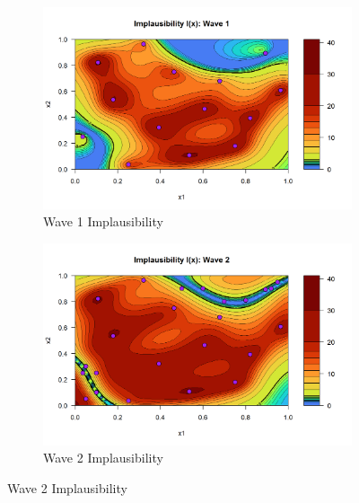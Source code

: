 \documentclass[12pt]{report} %
\begin{document}
\begin{figure}[H]
    \centering
    \begin{subfigure}{0.49\textwidth}
        \centering
        \includegraphics[width=\linewidth]{Wave 1 Implausibility.png}
        \caption{Wave 1 Implausibility}
        \label{fig:wave1}
    \end{subfigure}
    \hfill
    \begin{subfigure}{0.49\textwidth}
        \centering
        \includegraphics[width=\linewidth]{Wave 2 Implausibility.png}
        \caption{Wave 2 Implausibility}
        \label{fig:wave2}
    \end{subfigure}
    

\end{figure}
\end{document}
